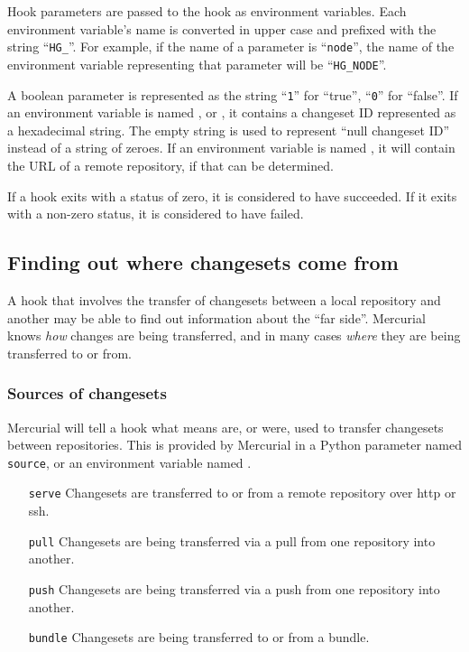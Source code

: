 Hook parameters are passed to the hook as environment variables.  Each
environment variable's name is converted in upper case and prefixed
with the string ``\texttt{HG\_}''.  For example, if the name of a
parameter is ``\texttt{node}'', the name of the environment variable
representing that parameter will be ``\texttt{HG\_NODE}''.

A boolean parameter is represented as the string ``\texttt{1}'' for
``true'', ``\texttt{0}'' for ``false''.  If an environment variable is
named ,  or , it
contains a changeset ID represented as a hexadecimal string.  The
empty string is used to represent ``null changeset ID'' instead of a
string of zeroes.  If an environment variable is named
, it will contain the URL of a remote repository, if
that can be determined.

If a hook exits with a status of zero, it is considered to have
succeeded.  If it exits with a non-zero status, it is considered to
have failed.

\subsection{Finding out where changesets come from}

A hook that involves the transfer of changesets between a local
repository and another may be able to find out information about the
``far side''.  Mercurial knows \emph{how} changes are being
transferred, and in many cases \emph{where} they are being transferred
to or from.

\subsubsection{Sources of changesets}
\label{sec:hook:sources}

Mercurial will tell a hook what means are, or were, used to transfer
changesets between repositories.  This is provided by Mercurial in a
Python parameter named \texttt{source}, or an environment variable named
.

\begin{itemize}
\item[\texttt{serve}] Changesets are transferred to or from a remote
  repository over http or ssh.
\item[\texttt{pull}] Changesets are being transferred via a pull from
  one repository into another.
\item[\texttt{push}] Changesets are being transferred via a push from
  one repository into another.
\item[\texttt{bundle}] Changesets are being transferred to or from a
  bundle.
\end{itemize}

